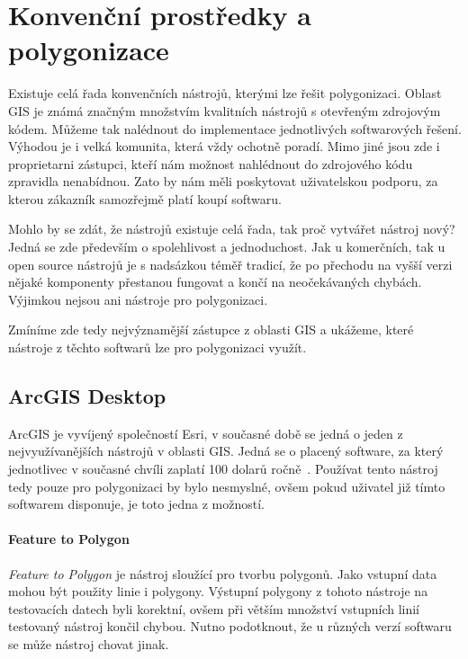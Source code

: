 \chapter{Konvenční prostředky a polygonizace}
\label{chap:konvencni prostredky a polygonizace}
Existuje celá řada konvenčních nástrojů, kterými lze řešit
polygonizaci. Oblast GIS je známá značným množstvím kvalitních
nástrojů s otevřeným zdrojovým kódem. Můžeme tak nalédnout do
implementace jednotlivých softwarových řešení. Výhodou je i velká
komunita, která vždy ochotně poradí. Mimo jiné jsou zde i proprietarni
zástupci, kteří nám možnost nahlédnout do zdrojového kódu zpravidla
nenabídnou. Zato by nám měli poskytovat uživatelskou podporu, za
kterou zákazník samozřejmě platí koupí softwaru.
	
Mohlo by se zdát, že nástrojů existuje celá řada, tak proč vytvářet
nástroj nový? Jedná se zde především o spolehlivost a
jednoduchost. Jak u komerčních, tak u open source nástrojů je s
nadsázkou téměř tradicí, že po přechodu na vyšší verzi nějaké
komponenty přestanou fungovat a končí na neočekávaných
chybách. Výjimkou nejsou ani nástroje pro polygonizaci.
	
Zmíníme zde tedy nejvýznamější zástupce z oblasti GIS a ukážeme, které
nástroje z těchto softwarů lze pro polygonizaci využít.
	
\section{ArcGIS Desktop}
ArcGIS je vyvíjený společností Esri, v současné době se jedná o jeden
z nejvyužívanějších nástrojů v oblasti GIS. Jedná se o placený
software, za který jednotlivec v současné chvíli zaplatí 100
dolarů ročně~\cite{esri}. Používat tento nástroj tedy pouze pro polygonizaci by
bylo nesmyslné, ovšem pokud uživatel již tímto softwarem disponuje, je
toto jedna z možností.
	
\subsubsection{Feature to Polygon}
\textit{Feature to Polygon} je nástroj sloužící pro tvorbu
polygonů. Jako vstupní data mohou být použity linie i
polygony. Výstupní polygony z tohoto nástroje na testovacích datech
byli korektní, ovšem při větším množství vstupních linií testovaný
nástroj končil chybou. Nutno podotknout, že u různých verzí softwaru
se může nástroj chovat jinak.

